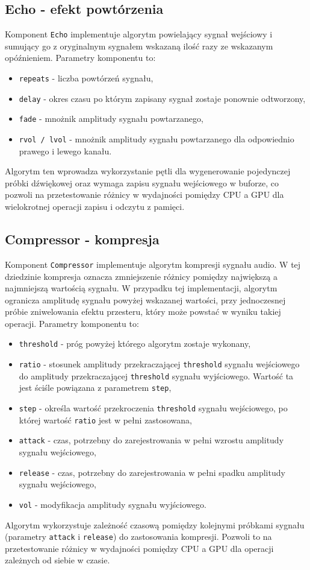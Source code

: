 \subsection{Echo - efekt powtórzenia}
Komponent \texttt{Echo} implementuje algorytm powielający sygnał wejściowy i sumujący go z oryginalnym sygnałem wskazaną ilość razy ze wskazanym opóźnieniem. Parametry komponentu to:
\begin{itemize}
    \item \texttt{repeats} - liczba powtórzeń sygnału,
    \item \texttt{delay} - okres czasu po którym zapisany sygnał zostaje ponownie odtworzony,
    \item \texttt{fade} - mnożnik amplitudy sygnału powtarzanego,
    \item \texttt{rvol / lvol} - mnożnik amplitudy sygnału powtarzanego dla odpowiednio prawego i lewego kanału.
\end{itemize}
Algorytm ten wprowadza wykorzystanie pętli dla wygenerowanie pojedynczej próbki dźwiękowej oraz wymaga zapisu sygnału wejściowego w buforze, co pozwoli na przetestowanie różnicy w wydajności pomiędzy CPU a GPU dla wielokrotnej operacji zapisu i odczytu z pamięci.

\subsection{Compressor - kompresja}
Komponent \texttt{Compressor} implementuje algorytm kompresji sygnału audio. W tej dziedzinie kompresja oznacza zmniejszenie różnicy pomiędzy największą a najmniejszą wartością sygnału. W przypadku tej implementacji, algorytm ogranicza amplitudę sygnału powyżej wskazanej wartości, przy jednoczesnej próbie zniwelowania efektu przesteru, który może powstać w wyniku takiej operacji. Parametry komponentu to:
\begin{itemize}
    \item \texttt{threshold} - próg powyżej którego algorytm zostaje wykonany,
    \item \texttt{ratio} - stosunek amplitudy przekraczającej \texttt{threshold} sygnału wejściowego do amplitudy przekraczającej \texttt{threshold} sygnału wyjściowego. Wartość ta jest ściśle powiązana z parametrem \texttt{step},
    \item \texttt{step} - określa wartość przekroczenia \texttt{threshold} sygnału wejściowego, po której wartość \texttt{ratio} jest w pełni zastosowana,
    \item \texttt{attack} - czas, potrzebny do zarejestrowania w pełni wzrostu amplitudy sygnału wejściowego,
    \item \texttt{release} - czas, potrzebny do zarejestrowania w pełni spadku amplitudy sygnału wejściowego,
    \item \texttt{vol} - modyfikacja amplitudy sygnału wyjściowego.
\end{itemize}
Algorytm wykorzystuje zależność czasową pomiędzy kolejnymi próbkami sygnału (parametry \texttt{attack} i \texttt{release}) do zastosowania kompresji. Pozwoli to na przetestowanie różnicy w wydajności pomiędzy CPU a GPU dla operacji zależnych od siebie w czasie.

